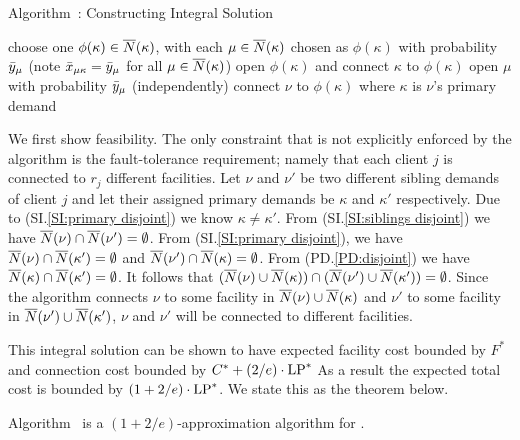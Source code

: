 \documentclass{llncs}
\begin{document}
\begin{algorithm}
  \caption{Algorithm~{\ECHS}:
    Constructing Integral Solution}
  \label{alg:lpr3}
  \begin{algorithmic}[1]
    \State choose one $\phi(\kappa)\in {\overline{N}}(\kappa)$,
    with each $\mu\in{\overline{N}}(\kappa)$ chosen as $\phi(\kappa)$
    with probability ${\bar y}_\mu$ (note {${\bar x}_{\mu\kappa} =
      {\bar y}_{\mu}$ for all $\mu \in {\overline{N}}(\kappa)$})
    \State open $\phi(\kappa)$ and connect $\kappa$ to $\phi(\kappa)$
    \EndFor
    \State open $\mu$ with probability ${\bar y}_\mu$ (independently)
    \EndFor
    \Else
    \State connect $\nu$ to $\phi(\kappa)$ where $\kappa$ is $\nu$'s
     primary demand
    \EndIf
    \EndFor
  \end{algorithmic}
\end{algorithm}


We first show feasibility.
The only constraint that is not explicitly
enforced by the algorithm is the fault-tolerance requirement; namely
that each client $j$ is connected to $r_j$ different facilities. Let
$\nu$ and $\nu'$ be two different sibling demands of client $j$ and
let their assigned primary demands be $\kappa$ and $\kappa'$
respectively. Due to (SI.\ref{SI:primary disjoint}) we know $\kappa
\neq \kappa'$. From (SI.\ref{SI:siblings disjoint}) we have
${\overline{N}}(\nu) \cap {\overline{N}}(\nu') = \emptyset$. From (SI.\ref{SI:primary
  disjoint}), we have ${\overline{N}}(\nu) \cap {\overline{N}}(\kappa') = \emptyset$
and ${\overline{N}}(\nu') \cap {\overline{N}}(\kappa) = \emptyset$. From
(PD.\ref{PD:disjoint}) we have ${\overline{N}}(\kappa)\cap {\overline{N}}(\kappa') =
\emptyset$. It follows that $({\overline{N}}(\nu) \cup {\overline{N}}(\kappa)) \cap
({\overline{N}}(\nu') \cup {\overline{N}}(\kappa')) = \emptyset$. Since the algorithm
connects $\nu$ to some facility in ${\overline{N}}(\nu) \cup {\overline{N}}(\kappa)$
and $\nu'$ to some facility in ${\overline{N}}(\nu') \cup {\overline{N}}(\kappa')$,
$\nu$ and $\nu'$ will be connected to different facilities. 

This integral solution can be shown to have expected facility cost
bounded by $F^\ast$ and connection cost bounded by $C^\ast +
(2/e)\cdot \mbox{\rm LP}^\ast$ As a result the expected total cost is bounded by
$(1 + 2/e)\cdot \mbox{\rm LP}^\ast$. We state this as the theorem below.
\begin{theorem}\label{thm:1736}
  Algorithm~{\ECHS} is a $(1+2/e)$-approximation algorithm for \FTFP.
\end{theorem}
\end{document}
